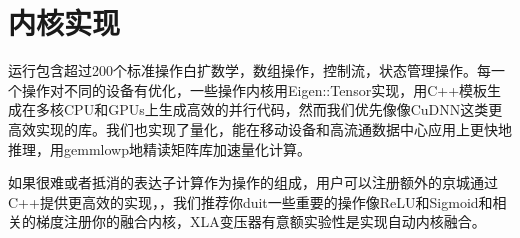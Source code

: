 \section{内核实现}
运行包含超过200个标准操作白扩数学，数组操作，控制流，状态管理操作。每一个操作对不同的设备有优化，一些操作内核用Eigen::Tensor实现，用C++模板生成在多核CPU和GPUs上生成高效的并行代码，然而我们优先像像CuDNN这类更高效实现的库。我们也实现了量化，能在移动设备和高流通数据中心应用上更快地推理，用gemmlowp地精读矩阵库加速量化计算。

如果很难或者抵消的表达子计算作为操作的组成，用户可以注册额外的京城通过C++提供更高效的实现，，我们推荐你duit一些重要的操作像ReLU和Sigmoid和相关的梯度注册你的融合内核，XLA变压器有意额实验性是实现自动内核融合。

